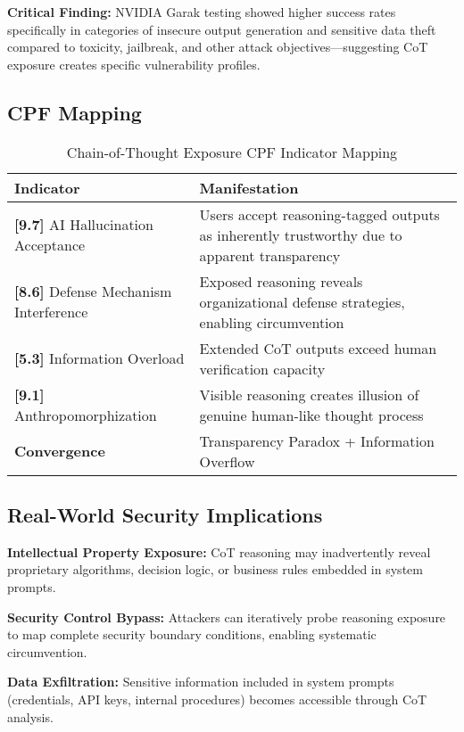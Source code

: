 \documentclass[11pt,a4paper]{article}
\begin{document}
\textbf{Critical Finding:} NVIDIA Garak testing showed higher success rates specifically in categories of insecure output generation and sensitive data theft compared to toxicity, jailbreak, and other attack objectives—suggesting CoT exposure creates specific vulnerability profiles.

\subsection{CPF Mapping}

\begin{table}[H]
\centering
\caption{Chain-of-Thought Exposure CPF Indicator Mapping}
\begin{tabular}{lp{10cm}}
\toprule
\textbf{Indicator} & \textbf{Manifestation} \\
\midrule
\textbf{[9.7]} AI Hallucination Acceptance & Users accept reasoning-tagged outputs as inherently trustworthy due to apparent transparency \\
\textbf{[8.6]} Defense Mechanism Interference & Exposed reasoning reveals organizational defense strategies, enabling circumvention \\
\textbf{[5.3]} Information Overload & Extended CoT outputs exceed human verification capacity \\
\textbf{[9.1]} Anthropomorphization & Visible reasoning creates illusion of genuine human-like thought process \\
\midrule
\textbf{Convergence} & Transparency Paradox + Information Overflow \\
\bottomrule
\end{tabular}
\end{table}

\subsection{Real-World Security Implications}

\textbf{Intellectual Property Exposure:} CoT reasoning may inadvertently reveal proprietary algorithms, decision logic, or business rules embedded in system prompts.

\textbf{Security Control Bypass:} Attackers can iteratively probe reasoning exposure to map complete security boundary conditions, enabling systematic circumvention.

\textbf{Data Exfiltration:} Sensitive information included in system prompts (credentials, API keys, internal procedures) becomes accessible through CoT analysis.
\end{document}
